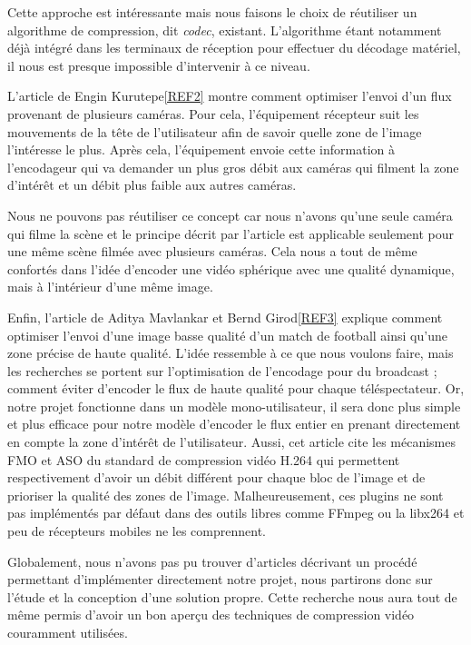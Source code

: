 \documentclass[11pt,a4paper]{article}
\begin{document}
Cette approche est intéressante mais nous faisons le choix de réutiliser un algorithme de compression, dit \textit{codec}, existant.
L'algorithme étant notamment déjà intégré dans les terminaux de réception pour effectuer du décodage matériel, il nous est presque impossible d'intervenir à ce niveau.

\bigbreak
L'article de Engin Kurutepe\ref{REF2} montre comment optimiser l'envoi d'un flux provenant de plusieurs caméras.
Pour cela, l'équipement récepteur suit les mouvements de la tête de l'utilisateur afin de savoir quelle zone de l'image l'intéresse le plus.
Après cela, l'équipement envoie cette information à l'encodageur qui va demander un plus gros débit aux caméras qui filment la zone d'intérêt et un débit plus faible aux autres caméras.

Nous ne pouvons pas réutiliser ce concept car nous n'avons qu'une seule caméra qui filme la scène et le principe décrit par l'article est applicable seulement pour une même scène filmée avec plusieurs caméras.
Cela nous a tout de même confortés dans l'idée d'encoder une vidéo sphérique avec une qualité dynamique, mais à l'intérieur d'une même image.

\bigbreak
	Enfin, l'article de Aditya Mavlankar et Bernd Girod\ref{REF3} explique comment optimiser l’envoi d’une image basse qualité d’un match de football ainsi qu’une zone précise de haute qualité.
L’idée ressemble à ce que nous voulons faire, mais les recherches se portent sur l’optimisation de l’encodage pour du broadcast ; comment éviter d’encoder le flux de haute qualité pour chaque téléspectateur.
Or, notre projet fonctionne dans un modèle mono-utilisateur, il sera donc plus simple et plus efficace pour notre modèle d’encoder le flux entier en prenant directement en compte la zone d'intérêt de l'utilisateur.
Aussi, cet article cite les mécanismes FMO et ASO du standard de compression vidéo H.264 qui permettent respectivement d’avoir un débit différent pour chaque bloc de l'image et de prioriser la qualité des zones de l’image.
Malheureusement, ces plugins ne sont pas implémentés par défaut dans des outils libres comme FFmpeg ou la libx264 et peu de récepteurs mobiles ne les comprennent.

\bigbreak
Globalement, nous n'avons pas pu trouver d'articles décrivant un procédé permettant d'implémenter directement notre projet, nous partirons donc sur l'étude et la conception d'une solution propre.
Cette recherche nous aura tout de même permis d'avoir un bon aperçu des techniques de compression vidéo couramment utilisées.
\end{document}
